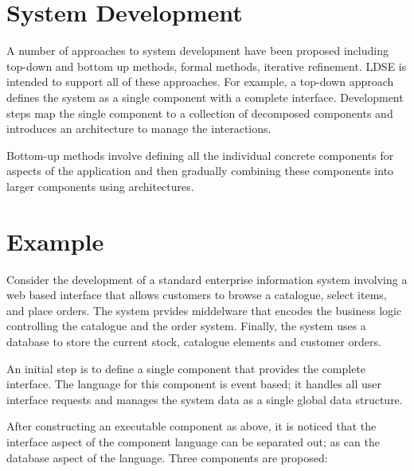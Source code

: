 \documentclass{article}
\begin{document}
\section{System Development}

A number of approaches to system development have been proposed including top-down and 
bottom up methods, formal methods, iterative refinement. LDSE is intended to support
all of these approaches. For example, a top-down approach defines the system as a single
component with a complete interface. Development steps map the single component to a 
collection of decomposed components and introduces an architecture to manage the interactions.

Bottom-up methods involve defining all the individual concrete components for aspects
of the application and then gradually combining these components into larger components
using architectures.

\section{Example}

Consider the development of a standard enterprise information system involving a web
based interface that allows customers to browse a catalogue, select items, and
place orders. The system prvides middelware that encodes the business logic controlling
the catalogue and the order system. Finally, the system uses a database to store the
current stock, catalogue elements and customer orders.

An initial step is to define a single component that provides the complete interface.
The language for this component is event based; it handles all user interface requests 
and manages the system data as a single global data structure.

After constructing an executable component as above, it is noticed that the interface
aspect of the component language can be separated out; as can the database aspect of the
language. Three components are proposed:
\end{document}
